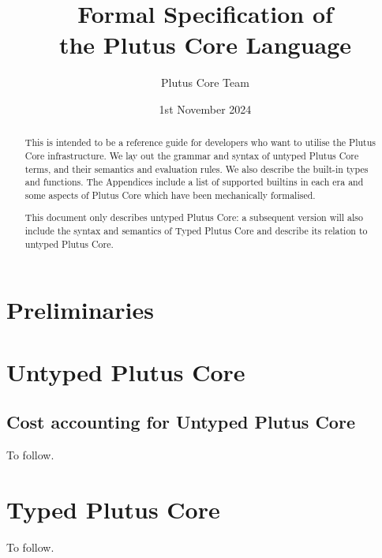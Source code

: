 \documentclass[a4paper]{report}
\title{Formal Specification of\\the Plutus Core Language\\
  \vspace{5mm}
  \LARGE{\red{\textsf{DRAFT}}}
}
\date{1st November 2024}
\author{Plutus Core Team}
\begin{document}
\maketitle

\begin{abstract}
  This is intended to be a reference guide for developers who want to utilise
  the Plutus Core infrastructure.  We lay out the grammar and syntax of untyped
  Plutus Core terms, and their semantics and evaluation rules.  We also describe
  the built-in types and functions.  The Appendices include a list of supported
  builtins in each era and some aspects of Plutus Core which have been
  mechanically formalised.

  This document only describes untyped Plutus Core: a subsequent version will also
  include the syntax and semantics of Typed Plutus Core and describe its relation to
  untyped Plutus Core.
\end{abstract}

\newpage
\tableofcontents
\newpage



\chapter{Preliminaries}


\chapter{Untyped Plutus Core}



\section{Cost accounting for Untyped Plutus Core}
To follow.
\chapter{Typed Plutus Core}
To follow.

\begin{appendices}



\end{appendices}

\newpage


\newpage
\printnomenclature[2cm]  %
\end{document}

